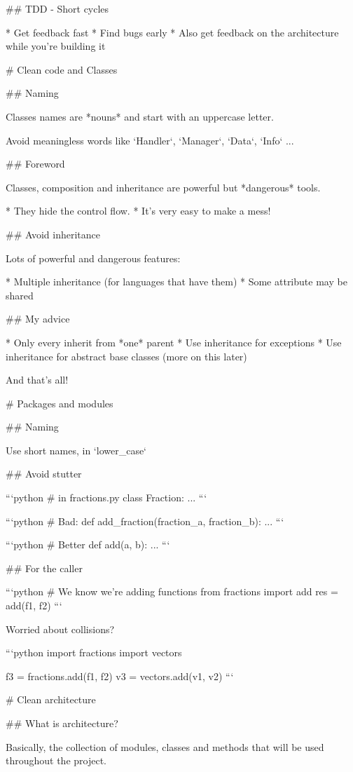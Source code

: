 ## TDD - Short cycles

 * Get feedback fast
 * Find bugs early
 * Also get feedback on the architecture while you're building it

# Clean code and Classes

## Naming

Classes names are *nouns* and start with an uppercase letter.

Avoid meaningless words like `Handler`, `Manager`, `Data`, `Info` ...

## Foreword

Classes, composition and inheritance are powerful but *dangerous* tools.

* They hide the control flow.
* It's very easy to make a mess!

## Avoid inheritance

Lots of powerful and dangerous features:

* Multiple inheritance (for languages that have them)
* Some attribute may be shared

## My advice

* Only every inherit from *one* parent
* Use inheritance for exceptions
* Use inheritance for abstract base classes (more on this later)

And that's all!

# Packages and modules

## Naming

Use short names, in `lower_case`

## Avoid stutter

```python
# in fractions.py
class Fraction:
    ...
```

```python
# Bad:
def add_fraction(fraction_a, fraction_b):
    ...
```

```python
# Better
def add(a, b):
    ...
```

## For the caller

```python
# We know we're adding functions
from fractions import add
res = add(f1, f2)
```

Worried about collisions?

```python
import fractions
import vectors

f3 = fractions.add(f1, f2)
v3 = vectors.add(v1, v2)
```

# Clean architecture

## What is architecture?

Basically, the collection of modules, classes and methods that will
be used throughout the project.

